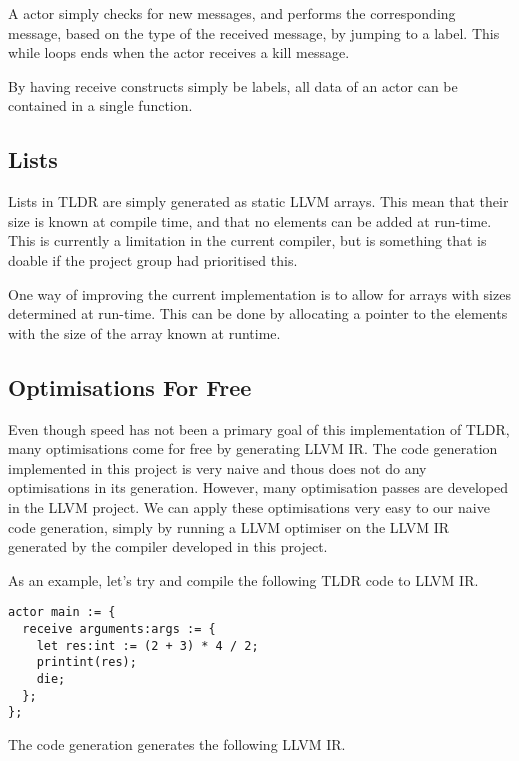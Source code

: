 A actor simply checks for new messages, and performs the corresponding message, based on the type of the received message, by jumping to a label. This while loops ends when the actor receives a kill message.

By having receive constructs simply be labels, all data of an actor can be contained in a single function.

\subsection{Lists}\label{codegen:lists}

Lists in TLDR are simply generated as static LLVM arrays. This mean that their size is known at compile time, and that no elements can be added at run-time. This is currently a limitation in the current compiler, but is something that is doable if the project group had prioritised this.

One way of improving the current implementation is to allow for arrays with sizes determined at run-time. This can be done by allocating a pointer to the elements with the size of the array known at runtime.

\subsection{Optimisations For Free}

Even though speed has not been a primary goal of this implementation of TLDR, many optimisations come for free by generating LLVM IR. The code generation implemented in this project is very naive and thous does not do any optimisations in its generation. However, many optimisation passes are developed in the LLVM project. We can apply these optimisations very easy to our naive code generation, simply by running a LLVM optimiser on the LLVM IR generated by the compiler developed in this project.

As an example, let's try and compile the following TLDR code to LLVM IR.

\begin{lstlisting}[breaklines]
actor main := {
  receive arguments:args := {
    let res:int := (2 + 3) * 4 / 2;
    printint(res);
    die;
  };
};
\end{lstlisting}

The code generation generates the following LLVM IR.

